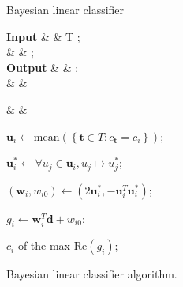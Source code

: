 \documentclass[twoside]{IEEEtran}
\begin{document}
\begin{figure}[!t]
    \centering
    \setlength{\intextsep}{0pt}

    \begin{algorithm}[H]
        \caption{Bayesian linear classifier}

        \begin{flalign*}
            \setlength{\arraycolsep}{0pt}
            \begin{matrix*}[l]
                \textbf{Input}  & \text{: } & T ;       \\
                \text{}         &           &  ;        \\
                \textbf{Output} & \text{: } &  ; \\
                \text{}         &           &
            \end{matrix*} &  &
        \end{flalign*}
        \begin{algorithmic}
            \State{}
                \State%
                \( \mathbf{u}_i \gets \mathrm{mean}\left(\left \{ \mathbf{t} \in T : c_\mathbf{t} = c_i \right \} \right) \);

                \State%
                \( \mathbf{u}_i^* \gets \forall u_j \in \mathbf{u}_i, u_j \mapsto u_j^* \);

                \State%
                \( \left(\mathbf{w}_i, w_{i0}\right) \gets \left(2\mathbf{u}_i^*, -\mathbf{u}_i^T \mathbf{u}_i^*\right) \);
            \EndFor%

            \State{}
                \State%
                \( g_i \gets \mathbf{w}_i^T \mathbf{d} + w_{i0} \);
            \EndFor%

            \State\Return%
            \( c_i \) of the max \( \mathrm{Re}\left(g_i\right) \);
        \end{algorithmic}
    \end{algorithm}

    \caption{Bayesian linear classifier algorithm.}%
    \label{bayes}
\end{figure}
\end{document}
